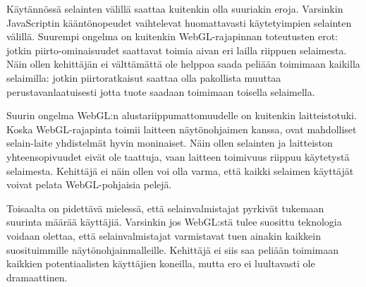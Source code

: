 Käytännössä selainten välillä saattaa kuitenkin olla suuriakin eroja. Varsinkin JavaScriptin kääntönopeudet vaihtelevat huomattavasti käytetyimpien selainten välillä\cite{hoetzlein}. Suurempi ongelma on kuitenkin WebGL-rajapinnan toteutusten erot: jotkin piirto-ominaisuudet saattavat toimia aivan eri lailla riippuen selaimesta\cite{voutilainen}. Näin ollen kehittäjän ei välttämättä ole helppoa saada peliään toimimaan kaikilla selaimilla: jotkin piirtoratkaisut saattaa olla pakollista muuttaa perustavanlaatuisesti jotta tuote saadaan toimimaan toisella selaimella.

Suurin ongelma WebGL:n alustariippumattomuudelle on kuitenkin laitteistotuki. Koska WebGL-rajapinta toimii laitteen näytönohjaimen kanssa, ovat mahdolliset selain-laite yhdistelmät hyvin moninaiset. Näin ollen selainten ja laitteiston yhteensopivuudet eivät ole taattuja, vaan laitteen toimivuus riippuu käytetystä selaimesta\cite{mozillaBlacklist}\cite{webgl_supported}. Kehittäjä ei näin ollen voi olla varma, että kaikki selaimen käyttäjät voivat pelata WebGL-pohjaisia pelejä.

Toisaalta on pidettävä mielessä, että selainvalmistajat pyrkivät tukemaan suurinta määrää käyttäjiä. Varsinkin jos WebGL:stä tulee suosittu teknologia voidaan olettaa, että selainvalmistajat varmistavat tuen ainakin kaikkein suosituimmille näytönohjainmalleille. Kehittäjä ei siis saa peliään toimimaan kaikkien potentiaalisten käyttäjien koneilla, mutta ero ei luultavasti ole dramaattinen.